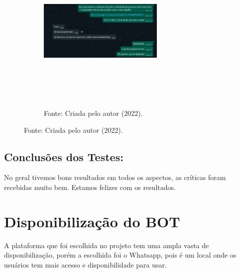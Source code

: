 \begin{itemize}
\begin{figure}[!htb]
\centering
\captionsetup[subfigure]{labelformat=empty}
\caption{``Teste 3''}
\begin{subfigure}{.5\textwidth}
\centering
\includegraphics[width=6cm,height=8cm]{Bot/Partes/Imagens/teste 3.png}
\caption{Fonte: Criada pelo autor (2022).}
\end{subfigure}%
\end{figure}

\newpage

\subsection{Conclusões dos Testes:}

No geral tivemos bons resultados em todos os aspectos, as críticas foram recebidas muito bem. Estamos felizes com os resultados. 

\section{Disponibilização do BOT}

 A plataforma que foi escolhida no projeto tem uma ampla vasta de disponibilização, porém a escolhida foi o Whatsapp, pois é um local onde os usuários tem mais acesso e disponibilidade para usar.
		
\end{itemize}

